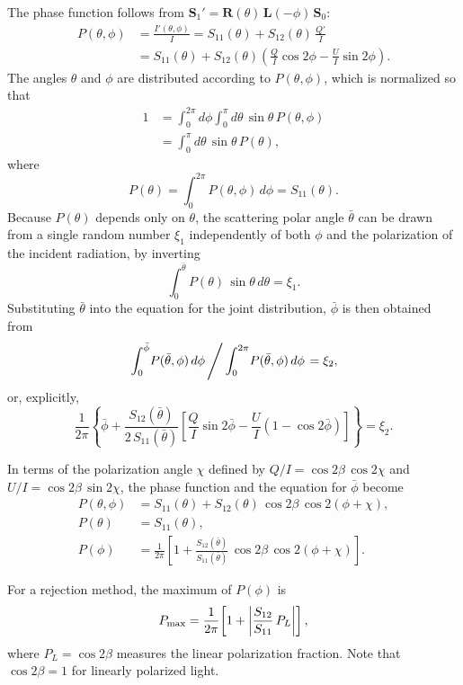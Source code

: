 \documentclass[english,a4paper]{kiseon_memo}
\begin{document}
The phase function follows from
$\mathbf{S}_{1}'=\mathbf{R}(\theta)\,\mathbf{L}(-\phi)\,\mathbf{S}_{0}$:
\begin{align*}
P(\theta,\phi) & = \frac{I'(\theta,\phi)}{I} = S_{11}(\theta) + S_{12}(\theta)\,\frac{Q'}{I}\\
& = S_{11}(\theta) + S_{12}(\theta)\!\left(\frac{Q}{I}\cos2\phi - \frac{U}{I}\sin2\phi\right).
\end{align*}
The angles $\theta$ and $\phi$ are distributed according to
$P(\theta,\phi)$, which is normalized so that
\begin{align*}
1 & = \int_{0}^{2\pi}\!\!d\phi\int_{0}^{\pi}\!d\theta\,\sin\theta\,P(\theta,\phi)\\
& = \int_{0}^{\pi}\!d\theta\,\sin\theta\,P(\theta),
\end{align*}
where
\[
P(\theta) = \int_{0}^{2\pi}\!P(\theta,\phi)\,d\phi = S_{11}(\theta).
\]
Because $P(\theta)$ depends only on $\theta$, the scattering polar
angle $\bar\theta$ can be drawn from a single random number
$\xi_{1}$ independently of both $\phi$ and the polarization of the
incident radiation, by inverting
\[
\int_{0}^{\bar{\theta}}\!P(\theta)\,\sin\theta\,d\theta = \xi_{1}.
\]
Substituting $\bar\theta$ into the equation for the joint
distribution, $\bar\phi$ is then obtained from
\[
\left.\int_{0}^{\bar{\phi}}\!P(\bar{\theta},\phi)\,d\phi\,\middle/\,\int_{0}^{2\pi}\!P(\bar{\theta},\phi)\,d\phi\right. = \xi_{2},
\]
or, explicitly,
\[
\frac{1}{2\pi}\!\left\{\bar{\phi} + \frac{S_{12}(\bar{\theta})}{2\,S_{11}(\bar{\theta})}\!\left[\frac{Q}{I}\sin2\bar{\phi} - \frac{U}{I}\!\left(1-\cos2\bar{\phi}\right)\right]\right\} = \xi_{2}.
\]

In terms of the polarization angle $\chi$ defined by
$Q/I = \cos2\beta\,\cos2\chi$ and $U/I = \cos2\beta\,\sin2\chi$,
the phase function and the equation for $\bar\phi$ become
\begin{align*}
P(\theta,\phi) & = S_{11}(\theta) + S_{12}(\theta)\,\cos2\beta\,\cos2(\phi+\chi),\\
P(\theta) & = S_{11}(\theta),\\
P(\phi) & = \frac{1}{2\pi}\!\left[1 + \frac{S_{12}(\bar{\theta})}{S_{11}(\bar{\theta})}\,\cos2\beta\,\cos2(\phi+\chi)\right].
\end{align*}

For a rejection method, the maximum of $P(\phi)$ is
\[
P_{\rm max} = \frac{1}{2\pi}\!\left[1 + \left|\frac{S_{12}}{S_{11}}\,P_{L}\right|\right],
\]
where $P_{L} = \cos2\beta$ measures the linear polarization
fraction. Note that $\cos2\beta = 1$ for linearly polarized light.
\end{document}
